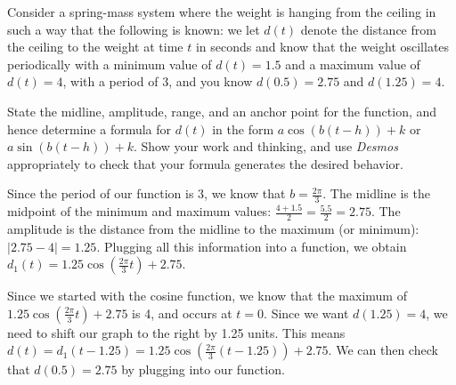 \documentclass{ximera}
\begin{document}
\begin{example}
Consider a spring-mass system where the weight is hanging from the ceiling in such a way that the following is known: we let \(d(t)\) denote the distance from the ceiling to the weight at time \(t\) in seconds and know that the weight oscillates periodically with a minimum value of \(d(t) = 1.5\) and a maximum value of \(d(t) = 4\), with a period of \(3\), and you know \(d(0.5) = 2.75\) and \(d\left(1.25\right) = 4\).%

State the midline, amplitude, range, and an anchor point for the function, and hence determine a formula for \(d(t)\) in the form \(a\cos(b(t-h))+k\) or \(a\sin(b(t-h))+k\). Show your work and thinking, and use \emph{Desmos} appropriately to check that your formula generates the desired behavior.%

\begin{explanation}
Since the period of our function is 3, we know that $b = \frac{2\pi}{3}$. The midline is the midpoint of the minimum and maximum values: $\frac{4 + 1.5}{2} = \frac{5.5}{2} = 2.75$. The amplitude is the distance from the midline to the maximum (or minimum): $|2.75 - 4| = 1.25$. Plugging all this information into a function, we obtain $d_1(t) = 1.25\cos\left(\frac{2\pi}{3}t\right) + 2.75$. 

Since we started with the cosine function, we know that the maximum of $1.25\cos\left(\frac{2\pi}{3}t\right) + 2.75$ is 4, and occurs at $t = 0$. Since we want $d(1.25) = 4$, we need to shift our graph to the right by 1.25 units. This means $d(t) = d_1(t - 1.25) = 1.25\cos\left(\frac{2\pi}{3}(t - 1.25)\right) + 2.75$. We can then check that $d(0.5) = 2.75$ by plugging into our function. 
\end{explanation}
\end{example}
\end{document}
